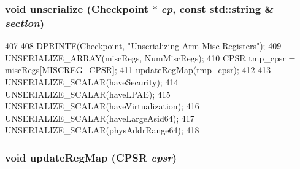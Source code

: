 \label{structArmISA_1_1ISA_ac79ec0e36bd10b6ae9a109def0b71fb2}
\hypertarget{structArmISA_1_1ISA_af22e5d6d660b97db37003ac61ac4ee49}{
\subsubsection[{unserialize}]{\setlength{\rightskip}{0pt plus 5cm}void unserialize ({\bf Checkpoint} $\ast$ {\em cp}, \/  const std::string \& {\em section})}}
\label{structArmISA_1_1ISA_af22e5d6d660b97db37003ac61ac4ee49}



\begin{DoxyCode}
407         {
408             DPRINTF(Checkpoint, "Unserializing Arm Misc Registers\n");
409             UNSERIALIZE_ARRAY(miscRegs, NumMiscRegs);
410             CPSR tmp_cpsr = miscRegs[MISCREG_CPSR];
411             updateRegMap(tmp_cpsr);
412 
413             UNSERIALIZE_SCALAR(haveSecurity);
414             UNSERIALIZE_SCALAR(haveLPAE);
415             UNSERIALIZE_SCALAR(haveVirtualization);
416             UNSERIALIZE_SCALAR(haveLargeAsid64);
417             UNSERIALIZE_SCALAR(physAddrRange64);
418         }
\end{DoxyCode}
\hypertarget{structArmISA_1_1ISA_a2459588c548b25984ed5b75051741841}{
\subsubsection[{updateRegMap}]{\setlength{\rightskip}{0pt plus 5cm}void updateRegMap (CPSR {\em cpsr})}}
\label{structArmISA_1_1ISA_a2459588c548b25984ed5b75051741841}



